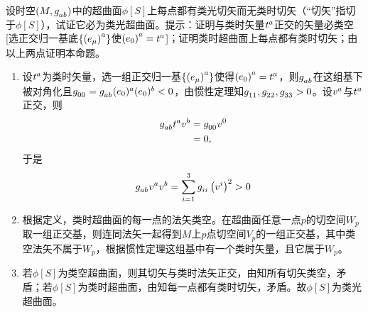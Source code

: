 \begin{xiti}
	\item 设时空$\left(M,\tensor{g}{_a_b}\right)$中的超曲面$\phi[S]$上每点都有类光切矢而无类时切矢（“切矢”指切于$\phi[S]$），试证它必为类光超曲面。提示：证明与类时矢量$\tensor{t}{^a}$正交的矢量必类空[选正交归一基底$\{ \tensor{\left(e_\mu\right)}{^a} \}$使$ \tensor{\left(e_0\right)}{^a}= \tensor{t}{^a} $]；证明类时超曲面上每点都有类时切矢；由以上两点证明本命题。
	
	\begin{zm}
		\begin{enumerate}
			\item[\circled{1}] 设$\tensor{t}{^a} $为类时矢量，选一组正交归一基$ \{ \tensor{\left(e_\mu\right)}{^a} \} $使得$ \tensor{\left(e_0\right)}{^a}=\tensor{t}{^a} $，则$\tensor{g}{_a_b} $在这组基下被对角化且$\tensor{g}{_0_0}= \tensor{g}{_a_b} \tensor{(e_0)}{^a} \tensor{(e_0)}{^b} <0 $，由惯性定理知$\tensor{g}{_1_1},\tensor{g}{_2_2} , \tensor{g}{_3_3}>0 $。设$\tensor{v}{^a} $与$ \tensor{t}{^a} $正交，则
			\begin{align*}
			\tensor{g}{_a_b} \tensor{t}{^a} \tensor{v}{^b} &= \tensor{g}{_0_0} \tensor{v}{^0}\\
			&=0,
			\end{align*}
			于是
			\begin{equation*}
			\tensor{g}{_a_b} \tensor{v}{^a} \tensor{v}{^b} = \sum_{i=1}^{3} \tensor{g}{_i_i} \left(\tensor{v}{^i}\right)^2>0
			\end{equation*}
			\item[\circled{2}] 根据定义，类时超曲面的每一点的法矢类空。在超曲面任意一点$p$的切空间$W_p $取一组正交基，则连同法矢一起得到$M$上$p$点切空间$V_p$的一组正交基，其中类空法矢不属于$W_p$，根据惯性定理这组基中有一个类时矢量，且它属于$W_p$。
			\item[\circled{3}] 若$\phi[S] $为类空超曲面，则其切矢与类时法矢正交，由知所有切矢类空，矛盾；若$\phi[S] $为类时超曲面，由知每一点都有类时切矢，矛盾。故$\phi[S] $为类光超曲面。
		\end{enumerate}
		
	\end{zm}
	
	
	
	
	
	
\end{xiti}